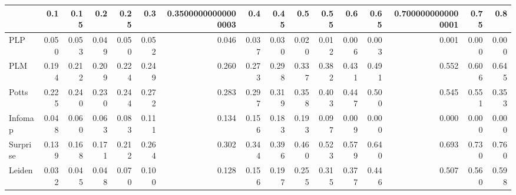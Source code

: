 \begin{tabular}{lrrrrrrrrrrrrrrr}
\toprule
{} &   0.1 &  0.15 &   0.2 &  0.25 &   0.3 & 0.35000000000000003 &   0.4 &  0.45 &   0.5 &  0.55 &   0.6 &  0.65 & 0.7000000000000001 &  0.75 &   0.8 \\
\midrule
PLP      & 0.050 & 0.053 & 0.049 & 0.050 & 0.052 &               0.046 & 0.037 & 0.030 & 0.020 & 0.012 & 0.006 & 0.003 &              0.001 & 0.000 & 0.000 \\
PLM      & 0.194 & 0.212 & 0.209 & 0.224 & 0.249 &               0.260 & 0.273 & 0.298 & 0.337 & 0.382 & 0.431 & 0.491 &              0.552 & 0.606 & 0.645 \\
Potts    & 0.225 & 0.240 & 0.230 & 0.244 & 0.272 &               0.283 & 0.297 & 0.319 & 0.358 & 0.403 & 0.447 & 0.500 &              0.545 & 0.551 & 0.353 \\
Infomap  & 0.048 & 0.060 & 0.063 & 0.083 & 0.111 &               0.134 & 0.156 & 0.183 & 0.193 & 0.097 & 0.009 & 0.000 &              0.000 & 0.000 & 0.000 \\
Surprise & 0.139 & 0.168 & 0.171 & 0.212 & 0.264 &               0.302 & 0.344 & 0.396 & 0.460 & 0.523 & 0.579 & 0.640 &              0.693 & 0.730 & 0.760 \\
Leiden   & 0.032 & 0.045 & 0.048 & 0.070 & 0.100 &               0.128 & 0.156 & 0.197 & 0.255 & 0.315 & 0.377 & 0.446 &              0.507 & 0.560 & 0.598 \\
\bottomrule
\end{tabular}
